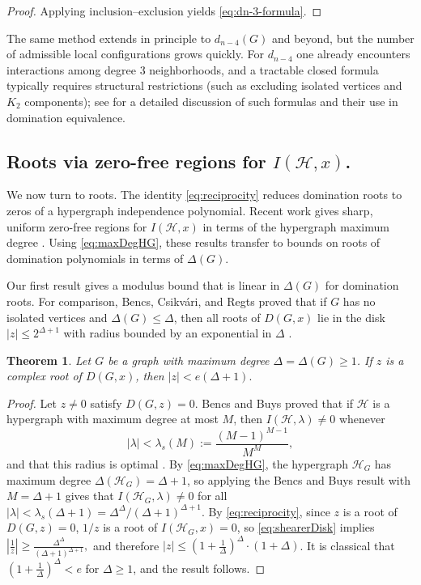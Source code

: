 \documentclass[11pt]{amsart}
\newtheorem{theorem}{Theorem}
\numberwithin{equation}{section}
\newcommand{\HH}{\mathcal{H}}
\begin{document}
\begin{proof}
Applying inclusion--exclusion yields \eqref{eq:dn-3-formula}.
\end{proof}

The same method extends in principle to $d_{n-4}(G)$ and beyond, but the number of admissible local configurations grows quickly. For $d_{n-4}$ one already encounters interactions among degree $3$ neighborhoods, and a tractable closed formula typically requires structural restrictions (such as excluding isolated vertices and $K_2$ components); see \cite{BeatonPaths2019} for a detailed discussion of such formulas and their use in domination equivalence.

\subsection{Roots via zero-free regions for $I(\HH,x)$.}


We now turn to roots. The identity \eqref{eq:reciprocity} reduces domination roots to zeros of a hypergraph independence polynomial. Recent work gives sharp, uniform zero-free regions for $I(\HH,x)$ in terms of the hypergraph maximum degree \cite{BencsBuys2025}. Using \eqref{eq:maxDegHG}, these results transfer to bounds on roots of domination polynomials in terms of $\Delta(G)$.

Our first result gives a modulus bound that is linear in $\Delta(G)$ for domination roots. For comparison, Bencs, Csikv\'ari, and Regts proved that if $G$ has no isolated vertices and $\Delta(G)\le \Delta$, then all roots of $D(G,x)$ lie in the disk $|z|\le 2^{\Delta+1}$ with radius bounded by an exponential in $\Delta$ \cite{BencsCsikvariRegts2021}. %

\begin{theorem}\label{thm:linearRootBound}
Let $G$ be a graph with maximum degree $\Delta=\Delta(G)\ge 1$. If $z$ is a complex root of $D(G,x)$, then $|z|<e(\Delta+1).$
\end{theorem}

\begin{proof}
Let $z\neq 0$ satisfy $D(G,z)=0$. Bencs and Buys proved that if $\HH$ is a hypergraph with maximum degree at most $M$, then $I(\HH,\lambda)\neq 0$ whenever
\begin{equation}\label{eq:shearerDisk}
|\lambda|<\lambda_s(M):=\frac{(M-1)^{M-1}}{M^{M}},
\end{equation}
and that this radius is optimal \cite{BencsBuys2025}. By \eqref{eq:maxDegHG}, the hypergraph $\HH_G$ has maximum degree $\Delta(\HH_G)=\Delta+1$, so applying the Bencs and Buys result with $M=\Delta+1$ gives that $I(\HH_G,\lambda)\neq 0$ for all $|\lambda|<\lambda_s(\Delta+1)=\Delta^{\Delta}/(\Delta+1)^{\Delta+1}$. By \eqref{eq:reciprocity}, since $z$ is a root of $D(G,z)=0$, $1/z$ is a root of $I(\HH_G,x)=0$, so \eqref{eq:shearerDisk} implies $\left|\frac{1}{z}\right| \geq \frac{\Delta^{\Delta}}{(\Delta+1)^{\Delta+1}},$ and therefore $|z| \leq \left(1+\frac{1}{\Delta}\right)^\Delta \cdot (1+\Delta)$. It is classical that $\left(1+\frac{1}{\Delta}\right)^\Delta<e$ for $\Delta\ge 1$, and the result follows.
\end{proof}
\end{document}
